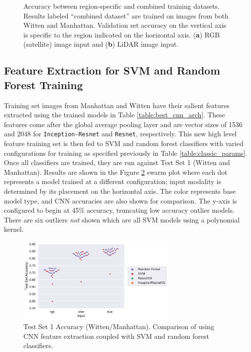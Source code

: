 \begin{figure}[h]
    \caption[Accuracy between region-specific and combined training datasets]{Accuracy between region-specific and combined training datasets. Results labeled ``combined dataset'' are trained on images from both Witten and Manhattan. Validation set accuracy on the vertical axis is specific to the region indicated on the horizontal axis. (\textbf{a}) RGB (satellite) image input and (\textbf{b}) LiDAR image input.}
    \label{fig:cnn_multi}
\end{figure}


\vspace{-12pt}


\subsection{Feature Extraction for SVM and Random Forest Training}

Training set images from Manhattan and Witten have their salient features extracted using the trained models in Table \ref{table:best_cnn_arch}.  These features come after the global average pooling layer and are vector sizes of 1536 and 2048 for \texttt{Inception-Resnet} and \texttt{Resnet}, respectively. This new high level feature training set is then fed to SVM and random forest classifiers with varied configurations for training as specified previously in Table \ref{table:classic_params}. Once all classifiers are trained, they are run against Test Set     1 (Witten and Manhattan). Results are shown in the Figure \ref{fig:test_classical_train} swarm plot where each dot represents a model trained at a different configuration; input modality is determined by its placement on the  horizontal axis. The color represents base model type, and  \ac{CNN}  accuracies are also shown for comparison. The y-axis is configured to begin at 45\% accuracy, truncating low accuracy outlier models. There are six outliers \emph{not} shown which are all SVM models using a polynomial kernel.

\begin{figure}[h]
\centering
\includegraphics[width=0.7\textwidth]{chapter_4_roofshape/imgs/test_data_set_classical.pdf}
\caption[Test Set 1 Accuracy (Witten/Manhattan)]{Test Set 1 Accuracy (Witten/Manhattan). Comparison of using CNN feature extraction coupled with SVM and random forest  classifiers.}
\label{fig:test_classical_train}
\end{figure}

